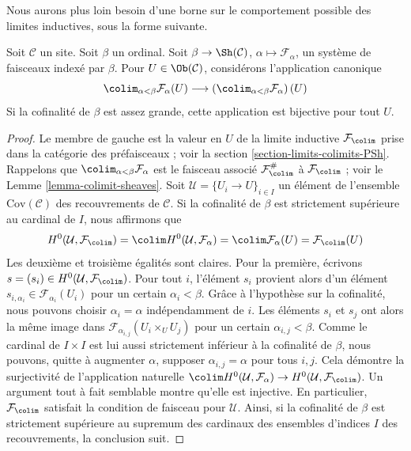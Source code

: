 \noindent
Nous aurons plus loin besoin d’une borne sur le comportement possible
des limites inductives, sous la forme suivante.

\begin{lemma}
\label{lemma-colimit-over-ordinal-sections}
Soit $\mathcal{C}$ un site. Soit $\beta$ un ordinal.
Soit $\beta \to \Sh(\mathcal{C})$, $\alpha \mapsto \mathcal{F}_\alpha$,
un système de faisceaux indexé par $\beta$. Pour $U \in \Ob(\mathcal{C})$,
considérons l’application canonique
$$
\colim_{\alpha < \beta} \mathcal{F}_\alpha(U)
\longrightarrow
\left(\colim_{\alpha < \beta} \mathcal{F}_\alpha \right)(U)
$$
Si la cofinalité de $\beta$ est assez grande, cette application
est bijective pour tout $U$.
\end{lemma}

\begin{proof}
Le membre de gauche est la valeur en $U$ de la limite inductive
$\mathcal{F}_{\colim}$ prise dans la catégorie des préfaisceaux ; voir
la section \ref{section-limits-colimits-PSh}.
Rappelons que $\colim_{\alpha < \beta} \mathcal{F}_\alpha$ est
le faisceau associé $\mathcal{F}_{\colim}^\#$ à $\mathcal{F}_{\colim}$ ;
voir le Lemme \ref{lemma-colimit-sheaves}.
Soit $\mathcal{U} = \{U_i \to U\}_{i \in I}$ un élément de
l’ensemble $\text{Cov}(\mathcal{C})$ des recouvrements de $\mathcal{C}$.
Si la cofinalité de $\beta$ est strictement supérieure au cardinal de $I$,
nous affirmons que
$$
H^0(\mathcal{U}, \mathcal{F}_{\colim}) =
\colim H^0(\mathcal{U}, \mathcal{F}_\alpha) =
\colim \mathcal{F}_\alpha(U) = \mathcal{F}_{\colim}(U)
$$
Les deuxième et troisième égalités sont claires. Pour la première, écrivons
$s = (s_i) \in H^0(\mathcal{U}, \mathcal{F}_{\colim})$.
Pour tout $i$, l’élément $s_i$ provient alors d’un élément
$s_{i, \alpha_i} \in \mathcal{F}_{\alpha_i}(U_i)$ pour un certain
$\alpha_i < \beta$. Grâce à l’hypothèse sur la cofinalité, nous pouvons
choisir $\alpha_i = \alpha$ indépendamment de $i$. Les éléments $s_i$ et $s_j$
ont alors la même image dans
$\mathcal{F}_{\alpha_{i, j}}(U_i \times_U U_j)$
pour un certain $\alpha_{i, j} < \beta$. Comme le cardinal de
$I \times I$ est lui aussi strictement inférieur à la cofinalité de $\beta$,
nous pouvons, quitte à augmenter $\alpha$, supposer
$\alpha_{i, j} = \alpha$ pour tous $i, j$. Cela démontre la surjectivité
de l’application naturelle
$\colim H^0(\mathcal{U}, \mathcal{F}_\alpha)
\to H^0(\mathcal{U}, \mathcal{F}_{\colim})$.
Un argument tout à fait semblable montre qu’elle est injective.
En particulier, $\mathcal{F}_{\colim}$ satisfait la condition de faisceau
pour $\mathcal{U}$.
Ainsi, si la cofinalité de $\beta$ est strictement supérieure au supremum
des cardinaux des ensembles d’indices $I$ des recouvrements, la conclusion suit.
\end{proof}

